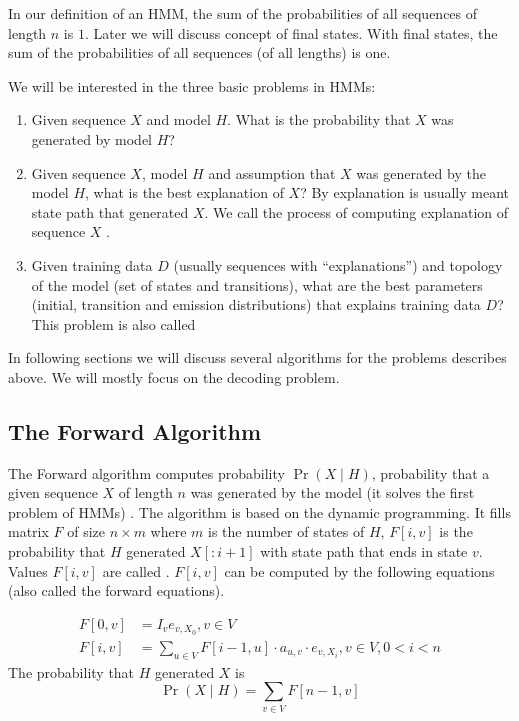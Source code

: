 \begin{note}
In our  definition of an HMM, the sum of the probabilities of all sequences of
length $n$ is $1$. Later we will discuss concept of final states. With final
states, the sum of the probabilities of all sequences (of all lengths) is one.

\end{note}

We will be interested in the three basic problems in HMMs:
\begin{enumerate}[itemsep=-1mm]
\item Given sequence $X$ and model $H$. What is the probability that $X$ was
generated by model $H$?
\item Given sequence $X$, model $H$ and assumption that $X$ was generated by the
model
$H$, what is the best explanation of $X$? By explanation is usually meant state
path that generated $X$. We call the process of computing explanation of
sequence $X$ .
\item Given training data $D$ (usually sequences with ``explanations'') and
topology of the model (set of states and transitions), what are the best parameters
(initial, transition and emission distributions) that explains training
data $D$? This problem is also called 
\end{enumerate} 
In following sections we will discuss several algorithms
for the problems describes above. We will mostly focus on the
decoding problem.


\subsection{The Forward Algorithm}
The Forward algorithm computes probability $\Pr\left(X\mid H\right)$, probability that a given sequence $X$ of
length $n$ was
generated by the model (it solves the first problem of HMMs) \cite{Durbin1998}. The algorithm is
based on the dynamic programming. It fills
matrix $F$ of size $n\times m$ where $m$ is the number of states of $H$, $F[i,v]$ is the probability that $H$
generated $X[:i+1]$ with state path that ends in state $v$. Values $F[i,v]$ are  called . $F[i,v]$ can be computed by the following equations (also called the
forward equations).

\begin{align}
F[0,v] &= I_ve_{v,X_0}, v\in V\\
F[i,v] &= \sum_{u\in V}F[i-1,u] \cdot a_{u,v} \cdot e_{v,X_i}, v\in V,0< i < n
\end{align}
The probability that $H$ generated $X$ is 
 \[\Pr\left(X\mid H\right) = \sum_{v\in V} F[n-1,v]\]

